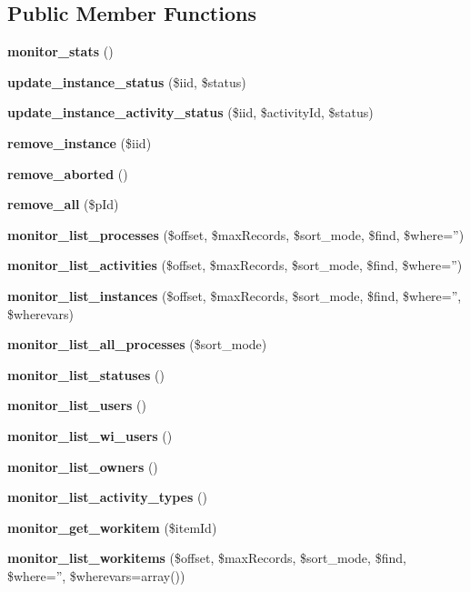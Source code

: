 \subsection*{Public Member Functions}
\begin{CompactItemize}
\item 
{\bf monitor\_\-stats} ()\label{classProcessMonitor_a0}

\item 
{\bf update\_\-instance\_\-status} (\$iid, \$status)\label{classProcessMonitor_a1}

\item 
{\bf update\_\-instance\_\-activity\_\-status} (\$iid, \$activity\-Id, \$status)\label{classProcessMonitor_a2}

\item 
{\bf remove\_\-instance} (\$iid)\label{classProcessMonitor_a3}

\item 
{\bf remove\_\-aborted} ()\label{classProcessMonitor_a4}

\item 
{\bf remove\_\-all} (\$p\-Id)\label{classProcessMonitor_a5}

\item 
{\bf monitor\_\-list\_\-processes} (\$offset, \$max\-Records, \$sort\_\-mode, \$find, \$where='')\label{classProcessMonitor_a6}

\item 
{\bf monitor\_\-list\_\-activities} (\$offset, \$max\-Records, \$sort\_\-mode, \$find, \$where='')\label{classProcessMonitor_a7}

\item 
{\bf monitor\_\-list\_\-instances} (\$offset, \$max\-Records, \$sort\_\-mode, \$find, \$where='', \$wherevars)\label{classProcessMonitor_a8}

\item 
{\bf monitor\_\-list\_\-all\_\-processes} (\$sort\_\-mode)\label{classProcessMonitor_a9}

\item 
{\bf monitor\_\-list\_\-statuses} ()\label{classProcessMonitor_a10}

\item 
{\bf monitor\_\-list\_\-users} ()\label{classProcessMonitor_a11}

\item 
{\bf monitor\_\-list\_\-wi\_\-users} ()\label{classProcessMonitor_a12}

\item 
{\bf monitor\_\-list\_\-owners} ()\label{classProcessMonitor_a13}

\item 
{\bf monitor\_\-list\_\-activity\_\-types} ()\label{classProcessMonitor_a14}

\item 
{\bf monitor\_\-get\_\-workitem} (\$item\-Id)\label{classProcessMonitor_a15}

\item 
{\bf monitor\_\-list\_\-workitems} (\$offset, \$max\-Records, \$sort\_\-mode, \$find, \$where='', \$wherevars=array())\label{classProcessMonitor_a16}

\end{CompactItemize}


